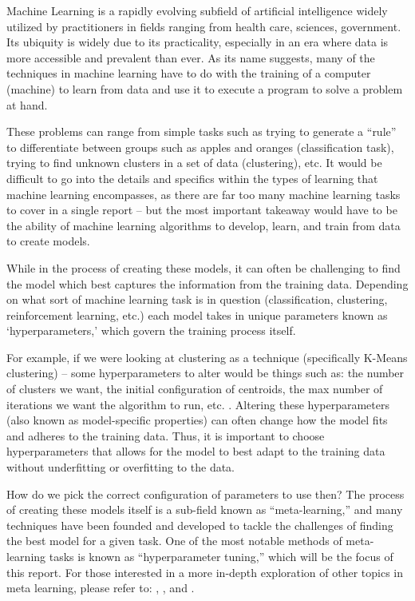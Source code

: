 \documentclass[12pt]{article}
\begin{document}
\label{sec:intro}

Machine Learning is a rapidly evolving subfield of artificial
intelligence widely utilized by practitioners in fields ranging from
health care, sciences, government. Its ubiquity is widely due to its
practicality, especially in an era where data is more accessible and
prevalent than ever. As its name suggests, many of the techniques in
machine learning have to do with the training of a computer (machine) to
learn from data and use it to execute a program to solve a problem at
hand.

These problems can range from simple tasks such as trying to generate a
``rule'' to differentiate between groups such as apples and oranges
(classification task), trying to find unknown clusters in a set of data
(clustering), etc. It would be difficult to go into the details and
specifics within the types of learning that machine learning
encompasses, as there are far too many machine learning tasks to cover
in a single report -- but the most important takeaway would have to be
the ability of machine learning algorithms to develop, learn, and train
from data to create models.

While in the process of creating these models, it can often be
challenging to find the model which best captures the information from
the training data. Depending on what sort of machine learning task is in
question (classification, clustering, reinforcement learning, etc.) each
model takes in unique parameters known as `hyperparameters,' which
govern the training process itself.

For example, if we were looking at clustering as a technique
(specifically K-Means clustering) -- some hyperparameters to alter would
be things such as: the number of clusters we want, the initial
configuration of centroids, the max number of iterations we want the
algorithm to run, etc. \citep{Picco2016}. Altering these hyperparameters
(also known as model-specific properties) can often change how the model
fits and adheres to the training data. Thus, it is important to choose
hyperparameters that allows for the model to best adapt to the training
data without underfitting or overfitting to the data.

How do we pick the correct configuration of parameters to use then? The
process of creating these models itself is a sub-field known as
``meta-learning,'' and many techniques have been founded and developed
to tackle the challenges of finding the best model for a given task. One
of the most notable methods of meta-learning tasks is known as
``hyperparameter tuning,'' which will be the focus of this report. For
those interested in a more in-depth exploration of other topics in meta
learning, please refer to: \citep{Hutter2014}, \citep{Vanschoren2018},
and \citep{Reif2012}.
\end{document}
